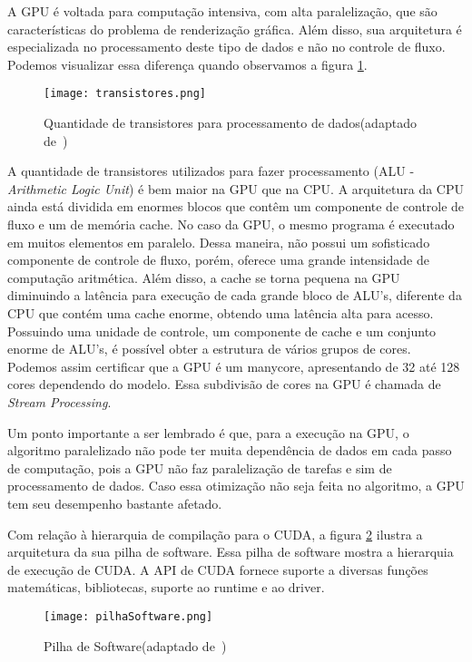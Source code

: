 A GPU é voltada para computação intensiva, com alta paralelização, que são características do problema de renderização gráfica. Além disso, sua arquitetura é especializada no processamento deste tipo de dados e não no controle de fluxo. Podemos visualizar essa diferença quando
observamos a figura \ref{fig: transistores}.

\begin{figure}[!htb]
	\begin{center}
	\centering
			\texttt{[image: transistores.png]}
	\caption{Quantidade de transistores para processamento de dados(adaptado de~\citep{cuda})}
	\label{fig: transistores}
	\end{center}
\end{figure}

A quantidade de transistores utilizados para fazer processamento (ALU - \textit{Arithmetic Logic Unit}) é bem maior na GPU que na CPU. A arquitetura da CPU ainda está dividida em enormes blocos que contêm um componente de controle de fluxo e um de memória cache. No caso da GPU, o mesmo programa é executado em muitos elementos em paralelo. Dessa maneira, não possui um sofisticado componente de controle de fluxo, porém, oferece uma grande intensidade de computação aritmética. Além disso, a cache se torna pequena na GPU diminuindo a latência para execução de cada grande bloco de ALU's, diferente da CPU que contém uma cache enorme, obtendo uma latência alta para acesso. Possuindo uma unidade de controle, um componente de cache e um conjunto enorme de ALU's, é possível obter a estrutura de vários grupos de
cores. Podemos assim certificar que a GPU é um manycore, apresentando de 32 até 128 cores dependendo do modelo. Essa subdivisão de cores na GPU é chamada de \textit{Stream Processing}.

Um ponto importante a ser lembrado é que, para a execução na GPU, o algoritmo paralelizado não pode ter muita dependência de dados em cada passo de computação, pois a GPU não faz paralelização de tarefas e sim de processamento de dados. Caso essa otimização não seja feita no algoritmo, a GPU tem seu desempenho bastante afetado.

Com relação à hierarquia de compilação para o CUDA, a figura \ref{fig: pilhaSoftware} ilustra a arquitetura da sua pilha de software. Essa pilha de software mostra a hierarquia de execução de CUDA. A API de CUDA fornece suporte a diversas funções matemáticas, bibliotecas, suporte ao runtime e ao driver.

\begin{figure}[!htb]
	\begin{center}
	\centering
			\texttt{[image: pilhaSoftware.png]}
	\caption{Pilha de Software(adaptado de~\citep{cuda})}
	\label{fig: pilhaSoftware}
	\end{center}
\end{figure}



